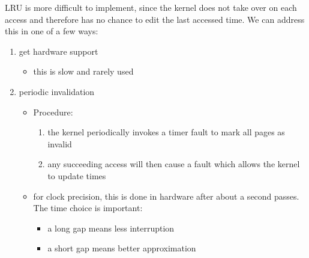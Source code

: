 \documentclass[../../lecture_notes.tex]{subfiles}
\begin{document}
LRU is more difficult to implement, since the kernel does not take over on each access and therefore has no chance to edit the last accessed time. We can address this in one of a few ways:
\begin{enumerate}
\item get hardware support
	\begin{itemize}
		\item this is slow and rarely used
	\end{itemize}
\item periodic invalidation
	\begin{itemize}
		\item Procedure:
		        \begin{enumerate}[nosep]
				\item the kernel periodically invokes a timer fault to mark all pages as invalid
				\item any succeeding access will then cause a fault which allows the kernel to update times
			\end{enumerate}
		\item for clock precision, this is done in hardware after about a second passes. The time choice is important: \begin{itemize}
			\item a long gap means less interruption
			\item a short gap means better approximation
		\end{itemize}
	\end{itemize}
\end{enumerate}
\end{document}

